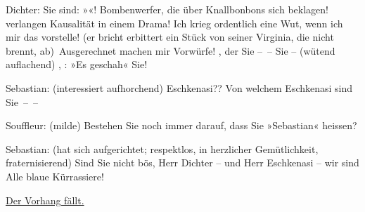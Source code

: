 \pstart
           Dichter: Sie sind: »\label{K_L01900-3v}\label{K_L01900-3h}«! Bombenwerfer, die über Knallbonbons sich beklagen!  verlangen Kausalität in einem Drama! Ich krieg
               ordentlich eine Wut, wenn ich mir das vorstelle! (er bricht erbittert ein Stück von
               seiner Virginia, die nicht brennt, ab) Ausgerechnet 
               machen mir Vorwürfe! {\pb}, der Sie – – Sie – (wütend auflachend) , : »Es geschah« Sie!\pend
           
\pstart
           Sebastian: (interessiert aufhorchend) Eschkenasi?? Von welchem Eschkenasi sind
               Sie – –\pend
           
\pstart
           Souffleur: (milde) Bestehen Sie noch immer darauf, dass Sie  »Sebastian« heissen?\pend
           
\pstart
           Sebastian: (hat sich aufgerichtet; respektlos, in herzlicher Gemütlichkeit,
               fraternisierend) Sind Sie nicht bös, Herr Dichter – und Herr Eschkenasi – wir sind
               Alle blaue Kürrassiere!\pend
           
\pstart
           \centering{}\uline{Der Vorhang fällt.}\pend
           \endnumbering{}  
      